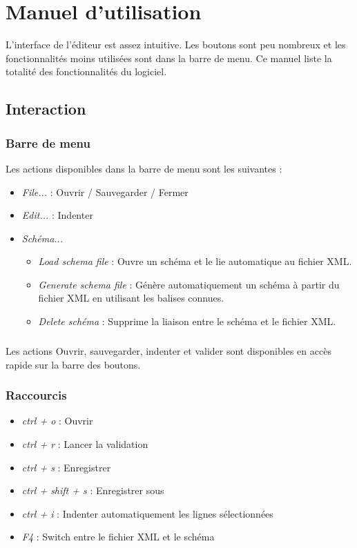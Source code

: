 \chapter{Manuel d'utilisation}

L'interface de l'éditeur est assez intuitive. Les boutons sont peu nombreux et les fonctionnalités moins utilisées sont dans la barre de menu.
Ce manuel liste la totalité des fonctionnalités du logiciel.

\section{Interaction}

\subsection{Barre de menu}


Les actions disponibles dans la barre de menu sont les suivantes :
\begin{itemize}
\item \emph{File...} : Ouvrir / Sauvegarder / Fermer
\item \emph{Edit...} : Indenter
\item \emph{Schéma...}
	\begin{itemize}
	\item \emph{Load schema file} : Ouvre un schéma et le lie automatique au fichier XML.
	\item \emph{Generate schema file} : Génère automatiquement un schéma à partir du fichier XML en utilisant les balises connues.
	\item \emph{Delete schéma} : Supprime la liaison entre le schéma et le fichier XML.
	\end{itemize}
\end{itemize}

\paragraph{}
Les actions Ouvrir, sauvegarder, indenter et valider sont disponibles en accès rapide sur la barre des boutons.

\subsection{Raccourcis}
\begin{itemize}
\item \emph{ctrl + o} : Ouvrir
\item \emph{ctrl + r} : Lancer la validation
\item \emph{ctrl + s} : Enregistrer 
\item \emph{ctrl + shift + s} : Enregistrer sous
\item \emph{ctrl + i} : Indenter automatiquement les lignes sélectionnées
\item \emph{F4} : Switch entre le fichier XML et le schéma
\end{itemize}

